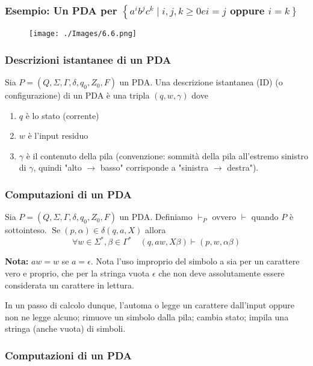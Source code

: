\subsubsection{Esempio: Un PDA per $\left\{a^{i} b^{j} c^{k} \mid i, j, k \geq 0 e i=j\right.$ oppure $\left.i=k\right\}$}

\begin{figure}[hbpt!]
    \centering
    \texttt{[image: ./Images/6.6.png]}
\end{figure}
\FloatBarrier

\subsubsection{Descrizioni istantanee di un PDA}
Sia $P=\left(Q, \Sigma, \Gamma, \delta, q_{0}, Z_{0}, F\right)$ un PDA. Una descrizione istantanea (ID) (o configurazione) di un PDA è una tripla $(q, w, \gamma)$ dove
\begin{enumerate}
    \item $q$ è lo stato (corrente)
    \item $w$ è l'input residuo
    \item $\gamma$ è il contenuto della pila (convenzione: sommità della pila all'estremo sinistro di $\gamma$, quindi "alto $\rightarrow$ basso" corrisponde a "sinistra $\rightarrow$ destra").
\end{enumerate}

\subsubsection{Computazioni di un PDA}

Sia $P=\left(Q, \Sigma, \Gamma, \delta, q_{0}, Z_{0}, F\right)$ un PDA. Definiamo $\vdash_{P}$ ovvero $\vdash$ quando $P$ è sottointeso.
$\operatorname{Se}(p, \alpha) \in \delta(q, a, X)$ allora
$$
\forall w \in \Sigma^{*}, \beta \in \Gamma^{*} \quad(q, a w, X \beta) \vdash(p, w, \alpha \beta)
$$

\textbf{Nota:} $a w=w$ se $a=\epsilon$. Nota l'uso improprio del simbolo a sia per un carattere vero e proprio, che per la stringa vuota $\epsilon$ che non deve assolutamente essere considerata un carattere in lettura.

In un passo di calcolo dunque, l'automa o legge un carattere dall'input oppure non ne legge alcuno; rimuove un simbolo dalla pila; cambia stato; impila una stringa (anche vuota) di simboli.

\subsubsection{Computazioni di un PDA}

